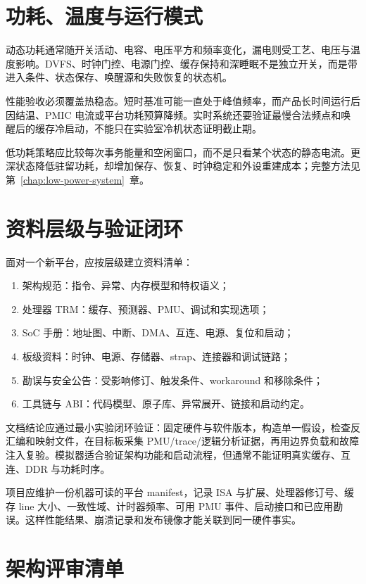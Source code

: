 \section{功耗、温度与运行模式}

动态功耗通常随开关活动、电容、电压平方和频率变化，漏电则受工艺、电压与温度影响。DVFS、时钟门控、电源门控、缓存保持和深睡眠不是独立开关，而是带进入条件、状态保存、唤醒源和失败恢复的状态机。

性能验收必须覆盖热稳态。短时基准可能一直处于峰值频率，而产品长时间运行后因结温、PMIC 电流或平台功耗预算降频。实时系统还要验证最慢合法频点和唤醒后的缓存冷启动，不能只在实验室冷机状态证明截止期。

低功耗策略应比较每次事务能量和空闲窗口，而不是只看某个状态的静态电流。更深状态降低驻留功耗，却增加保存、恢复、时钟稳定和外设重建成本；完整方法见第~\ref{chap:low-power-system}~章。

\section{资料层级与验证闭环}

面对一个新平台，应按层级建立资料清单：
\begin{enumerate}
  \item 架构规范：指令、异常、内存模型和特权语义；
  \item 处理器 TRM：缓存、预测器、PMU、调试和实现选项；
  \item SoC 手册：地址图、中断、DMA、互连、电源、复位和启动；
  \item 板级资料：时钟、电源、存储器、strap、连接器和调试链路；
  \item 勘误与安全公告：受影响修订、触发条件、workaround 和移除条件；
  \item 工具链与 ABI：代码模型、原子库、异常展开、链接和启动约定。
\end{enumerate}

文档结论应通过最小实验闭环验证：固定硬件与软件版本，构造单一假设，检查反汇编和映射文件，在目标板采集 PMU/trace/逻辑分析证据，再用边界负载和故障注入复验。模拟器适合验证架构功能和启动流程，但通常不能证明真实缓存、互连、DDR 与功耗时序。

项目应维护一份机器可读的平台 manifest，记录 ISA 与扩展、处理器修订号、缓存 line 大小、一致性域、计时器频率、可用 PMU 事件、启动接口和已应用勘误。这样性能结果、崩溃记录和发布镜像才能关联到同一硬件事实。

\section{架构评审清单}

